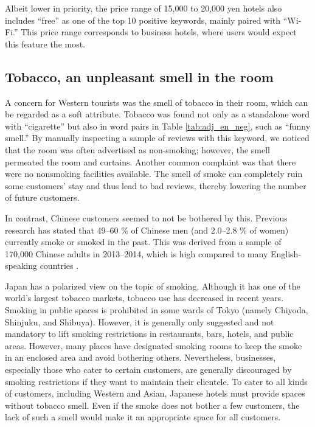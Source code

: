 \documentclass[smallextended,natbib]{svjour3}       %
\begin{document}
    Albeit lower in priority, the price range of 15,000 to 20,000 yen hotels also includes ``free'' as one of the top 10 positive keywords, mainly paired with ``Wi-Fi.'' This price range corresponds to business hotels, where users would expect this feature the most. 


  \subsection{Tobacco, an unpleasant smell in the room}\label{disc:tobacco}

    A concern for Western tourists was the smell of tobacco in their room, which can be regarded as a soft attribute. Tobacco was found not only as a standalone word with ``cigarette'' but also in word pairs in Table \ref{tab:adj_en_neg}, such as ``funny smell.'' By manually inspecting a sample of reviews with this keyword, we noticed that the room was often advertised as non-smoking; however, the smell permeated the room and curtains. Another common complaint was that there were no nonsmoking facilities available. The smell of smoke can completely ruin some customers’ stay and thus lead to bad reviews, thereby lowering the number of future customers.

    In contrast, Chinese customers seemed to not be bothered by this. Previous research has stated that 49–60 \% of Chinese men (and 2.0–2.8 \% of women) currently smoke or smoked in the past. This was derived from a sample of 170,000 Chinese adults in 2013–2014, which is high compared to many English-speaking countries \cite[][]{zhang2019tobacco,who2015tobacco}.

    Japan has a polarized view on the topic of smoking. Although it has one of the world’s largest tobacco markets, tobacco use has decreased in recent years. Smoking in public spaces is prohibited in some wards of Tokyo (namely Chiyoda, Shinjuku, and Shibuya). However, it is generally only suggested and not mandatory to lift smoking restrictions in restaurants, bars, hotels, and public areas. However, many places have designated smoking rooms to keep the smoke in an enclosed area and avoid bothering others. Nevertheless, businesses, especially those who cater to certain customers, are generally discouraged by smoking restrictions if they want to maintain their clientele. To cater to all kinds of customers, including Western and Asian, Japanese hotels must provide spaces without tobacco smell. Even if the smoke does not bother a few customers, the lack of such a smell would make it an appropriate space for all customers.
\end{document}
